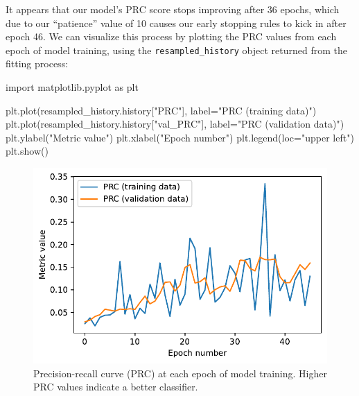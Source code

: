 \documentclass[
  letterpaper,
  DIV=11,
  numbers=noendperiod]{scrartcl}
\newenvironment{Shaded}{\begin{snugshade}}{\end{snugshade}}
\newcommand{\ImportTok}[1]{\textcolor[rgb]{0.00,0.46,0.62}{#1}}
\newcommand{\NormalTok}[1]{\textcolor[rgb]{0.00,0.23,0.31}{#1}}
\newcommand{\OperatorTok}[1]{\textcolor[rgb]{0.37,0.37,0.37}{#1}}
\newcommand{\StringTok}[1]{\textcolor[rgb]{0.13,0.47,0.30}{#1}}
\begin{document}
It appears that our model's PRC score stops improving after 36 epochs,
which due to our ``patience'' value of 10 causes our early stopping
rules to kick in after epoch 46. We can visualize this process by
plotting the PRC values from each epoch of model training, using the
\texttt{resampled\_history} object returned from the fitting process:

\begin{Shaded}
\begin{Highlighting}[]
\ImportTok{import}\NormalTok{ matplotlib.pyplot }\ImportTok{as}\NormalTok{ plt}

\NormalTok{plt.plot(resampled\_history.history[}\StringTok{"PRC"}\NormalTok{], label}\OperatorTok{=}\StringTok{"PRC (training data)"}\NormalTok{)}
\NormalTok{plt.plot(resampled\_history.history[}\StringTok{"val\_PRC"}\NormalTok{], label}\OperatorTok{=}\StringTok{"PRC (validation data)"}\NormalTok{)}
\NormalTok{plt.ylabel(}\StringTok{"Metric value"}\NormalTok{)}
\NormalTok{plt.xlabel(}\StringTok{"Epoch number"}\NormalTok{)}
\NormalTok{plt.legend(loc}\OperatorTok{=}\StringTok{"upper left"}\NormalTok{)}
\NormalTok{plt.show()}
\end{Highlighting}
\end{Shaded}

\begin{figure}[H]

{\centering \includegraphics{earth-science-ai-shrubland_files/figure-pdf/fig-training-output-1.pdf}

}

\caption{\label{fig-training}Precision-recall curve (PRC) at each epoch
of model training. Higher PRC values indicate a better classifier.}

\end{figure}
\end{document}
